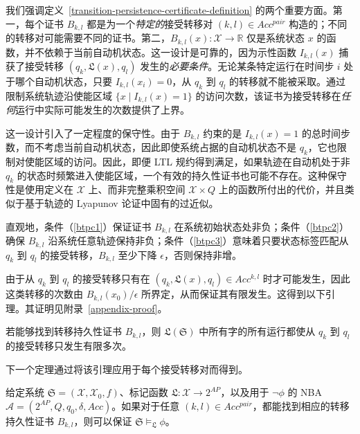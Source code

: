 我们强调定义~\ref{transition-persistence-certificate-definition} 的两个重要方面。第一，每个证书 $B_{k,l}$ 都是为一个\emph{特定的}接受转移对 $(k, l) \in Acc^{pair}$ 构造的；不同的转移对可能需要不同的证书。第二，$B_{k,l}(x): \mathcal{X} \rightarrow \mathbb{R}$ 仅是系统状态 $x$ 的函数，并不依赖于当前自动机状态。这一设计是可靠的，因为示性函数 $I_{k,l}(x)$ 捕获了接受转移 $(q_k, \mathfrak{L}(x), q_l)$ 发生的\emph{必要条件}。无论某条特定运行在时间步 $i$ 处于哪个自动机状态，只要 $I_{k,l}(x_i) = 0$，从 $q_k$ 到 $q_l$ 的转移就不能被采取。通过限制系统轨迹沿使能区域 $\{x \mid I_{k,l}(x) = 1\}$ 的访问次数，该证书为接受转移在\emph{任何}运行中实际可能发生的次数提供了上界。

这一设计引入了一定程度的保守性。由于 $B_{k,l}$ 约束的是 $I_{k,l}(x) = 1$ 的总时间步数，而不考虑当前自动机状态，因此即使系统占据的自动机状态不是 $q_k$，它也限制对使能区域的访问。因此，即便 LTL 规约得到满足，如果轨迹在自动机处于非 $q_k$ 的状态时频繁进入使能区域，一个有效的持久性证书也可能不存在。这种保守性是使用定义在 $\mathcal{X}$ 上、而非完整乘积空间 $\mathcal{X} \times Q$ 上的函数所付出的代价，并且类似于基于轨迹的 Lyapunov 论证中固有的过近似。

直观地，条件（\ref{btpc1}）保证证书 $B_{k,l}$ 在系统初始状态处非负；条件（\ref{btpc2}）确保 $B_{k,l}$ 沿系统任意轨迹保持非负；条件（\ref{btpc3}）意味着只要状态标签匹配从 $q_k$ 到 $q_l$ 的接受转移，$B_{k,l}$ 至少下降 $\epsilon$，否则保持非增。


由于从 $q_k$ 到 $q_l$ 的接受转移只有在 $(q_k, \mathfrak{L}(x), q_l) \in Acc^{k,l}$ 时才可能发生，因此这类转移的次数由 $B_{k,l}(x_0)/\epsilon$ 所界定，从而保证其有限发生。这得到以下引理。其证明见附录~\ref{appendix-proof}。

\begin{lemma}
  \label{transition-persistence-lemma}
  若能够找到转移持久性证书 $B_{k,l}$，则 $\mathfrak{L}(\mathfrak{S})$ 中所有字的所有运行都使从 $q_k$ 到 $q_l$ 的接受转移只发生有限多次。
\end{lemma}

下一个定理通过将该引理应用于每个接受转移对而得到。

\begin{theorem}
  \label{transition-persistence-LTL}
  给定系统 $\mathfrak{S} = (\mathcal{X}, \mathcal{X}_0, f)$、标记函数 $\mathfrak{L}:\mathcal{X} \rightarrow 2^{AP}$，以及用于 $\neg\phi$ 的 NBA $\mathcal{A} = (2^{AP}, Q, q_0, \delta, Acc)$。如果对于任意 $(k, l) \in Acc^{pair}$，都能找到相应的转移持久性证书 $B_{k,l}$，则可以保证 $\mathfrak{S} \models_{\mathfrak{L}} \phi$。
\end{theorem}

